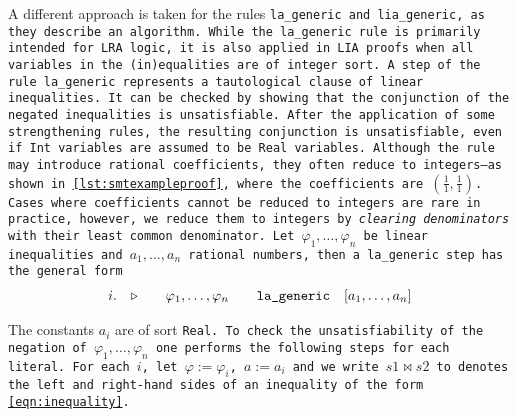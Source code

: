 A different approach is taken for the rules \tt{la\_generic} and \tt{lia\_generic}, as they describe an algorithm.
While the \tt{la\_generic rule} is primarily intended for LRA logic, it is also applied in LIA proofs when all variables in the (in)equalities are of integer sort.
A step of the rule \tt{la\_generic} represents a tautological clause of linear inequalities.  It can be checked by showing that the conjunction of
the negated inequalities is unsatisfiable. After the application of some strengthening rules, the resulting conjunction is unsatisfiable,
even if \lstinline[language=SMT,basicstyle=\ttfamily\footnotesize\upshape]{Int} variables are assumed to be \lstinline[language=SMT,basicstyle=\ttfamily\footnotesize\upshape]{Real} variables.
Although the rule may introduce rational coefficients, they often reduce to integers—as shown in \cref{lst:smtexampleproof}, where the coefficients are $(\frac{1}{1}, \frac{1}{1})$.
Cases where coefficients cannot be reduced to integers are rare in practice, however, we reduce them to integers by \emph{clearing denominators} with their least common denominator.
Let $\varphi_1,\dots, \varphi_n$ be linear inequalities and $a_1, \dots, a_n$ rational numbers, then a \tt{la\_generic} step has the general form
%
\[
\begin{matrix*}[c]
  i. & \ctxsep \quad & \varphi_1 , \dots , \varphi_n & \quad \tt{la\_generic}  & [a_1, \dots, a_n] \\
\end{matrix*}
\]

The constants $a_i$ are of sort \tt{Real}. To check the unsatisfiability of the negation of $\varphi_1, \dots, \varphi_n$ one performs the following steps for each literal. For each $i$, let $\varphi := \varphi_i$, $a := a_i$ and
we write $s1 \bowtie s2$ to denotes the left and right-hand sides of an inequality of the form \eqref{eqn:inequality}.

